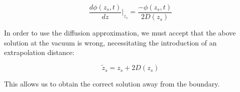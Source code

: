 \documentclass[12pt]{article}
\begin{document}
\begin{equation*}
\frac{d\phi(z_s,t)}{dz}\Bigr|_{z_s} = \frac{-\phi(z_s,t)}{2D(z_s)}
\end{equation*}

In order to use the diffusion approximation, we must accept that the above solution at the vacuum is 
wrong, necessitating the introduction of an extrapolation distance:

\begin{equation*}
\tilde{z}_s = z_s + 2D(z_s)
\end{equation*}

This allows us to obtain the correct solution away from the boundary.
\end{document}
